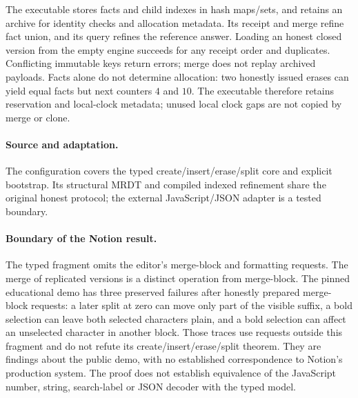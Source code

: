 The executable stores facts and child indexes in hash maps/sets, and retains
an archive for identity checks and allocation metadata. Its receipt and merge
refine fact union, and its query refines the reference answer. Loading an honest
closed version from the empty engine succeeds for any receipt order and
duplicates. Conflicting immutable keys return errors; merge does not replay
archived payloads. Facts alone do not determine allocation: two honestly issued
erases can yield equal facts but next counters $4$ and $10$. The executable
therefore retains reservation and local-clock metadata; unused local clock
gaps are not copied by merge or clone.

\paragraph{Source and adaptation.}
The configuration covers the typed create/insert/erase/split core and explicit bootstrap. Its structural MRDT and compiled indexed refinement share the original honest protocol; the external JavaScript/JSON adapter is a tested boundary.


\paragraph{Boundary of the Notion result.}
The typed fragment omits the editor's merge-block and formatting requests.
The merge of replicated versions is a distinct operation from merge-block.
The pinned educational demo has three preserved failures after honestly
prepared merge-block requests: a later split at zero can move only part of
the visible suffix, a bold selection can leave both selected characters
plain, and a bold selection can affect an unselected character in another
block. Those traces use requests outside this fragment and do not refute
its create/insert/erase/split theorem. They are findings about the public
demo, with no established correspondence to Notion's production system.
The proof does not establish equivalence of the JavaScript number,
string, search-label or JSON decoder with the typed model.

